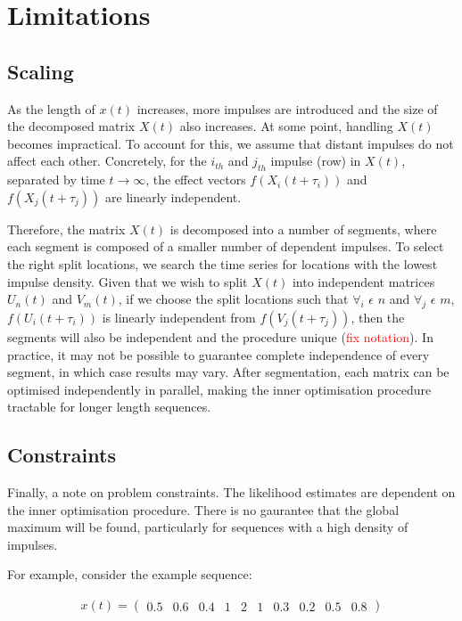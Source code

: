 \documentclass[11pt]{amsart}
\begin{document}
\section{Limitations}
\subsection{Scaling}
As the length of $x(t)$ increases, more impulses are introduced and the size of the decomposed matrix $X(t)$ also increases. At some point, handling $X(t)$ becomes impractical. To account for this, we assume that distant impulses do not affect each other. Concretely, for the $i_{th}$ and $j_{th}$ impulse (row) in $X(t)$, separated by time $t \longrightarrow \infty$, the effect vectors $f(X_i(t + \tau_i))$ and $f(X_j(t + \tau_j))$ are linearly independent.

Therefore, the matrix $X(t)$ is decomposed into a number of segments, where each segment is 
composed of a smaller number of dependent impulses. To select the right split locations, we search the time series for locations with the lowest impulse density. Given that we wish to split $X(t)$ into independent matrices $U_n(t)$ and $V_m(t)$, 
if we choose the split locations such that $\forall_i$ $\epsilon$ $n$ and  $\forall_j$ $\epsilon$ $m$, 
$f(U_i(t + \tau_i))$ is linearly independent from $f(V_j(t + \tau_j))$, 
then the segments will also be independent and the procedure unique (\textcolor{red}{fix notation}). 
In practice, it may not be possible to guarantee complete independence of every segment, 
in which case results may vary. After segmentation, each matrix can be optimised independently 
in parallel, making the inner optimisation procedure tractable for longer length sequences. 
\newline
\subsection{Constraints}
Finally, a note on problem constraints. The likelihood estimates are dependent on the inner optimisation procedure. There is no gaurantee that the global maximum will be found, particularly for sequences with a high density of impulses. 

For example, consider the example sequence:

\begin{align*}
    x(t) = 
    \left(
\begin{array}{cccccccccc}
    0.5 & 0.6 & 0.4 & 1 & 2 & 1 &
    0.3 & 0.2 & 0.5 & 0.8 
\end{array}  
\right)
\end{align*}
\end{document}
